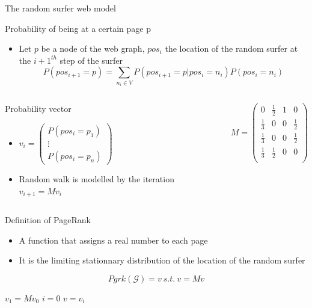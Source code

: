 \documentclass[10pt]{beamer}
\begin{document}
\begin{frame}{The random surfer web model}
\begin{block}{Probability of being at a certain page p}
\begin{itemize}
\item Let $p$ be a node of the web graph, $pos_i$ the location of the random surfer at the $i+1^{th}$ step of the surfer
$$ P(pos_{i+1}=p) = \sum_{n_i\in V} P(pos_{i+1}=p|pos_{i}=n_i)  P(pos_i = n_i)$$
\end{itemize}
\end{block}
\begin{columns}
\centering
\begin{column}{0.5\paperwidth}
\begin{block}{Probability vector}
\begin{itemize}
\item $ v_i =
\begin{pmatrix}
P(pos_i = p_1) \\
\vdots \\
P(pos_i = p_n)
\end{pmatrix}
$
\item Random walk is modelled by the iteration $v_{i+1} = M v_i$
\end{itemize}

\end{block}
\end{column}
\begin{column}{0.4\paperwidth}
$$M = \begin{pmatrix}
0 & \frac{1}{2} & 1 & 0 \\
\frac{1}{3} & 0 & 0 & \frac{1}{2} \\
\frac{1}{3} & 0 & 0 & \frac{1}{2} \\
\frac{1}{3} & \frac{1}{2} & 0 & 0 \\
\end{pmatrix}$$
\end{column}
\end{columns}
\end{frame}

\begin{frame}{Definition of PageRank}
  \begin{definition}
    \begin{itemize}
      \item A function that assigns a real number to each page
	\item It is the limiting stationnary distribution of the location of the random surfer
    \end{itemize}
    $$Pgrk(\mathcal{G}) = v \:s.t.\: v=Mv $$
  \end{definition}
  \begin{algorithm}[H]
    $v_1 = Mv_0$\;
    $i=0$\;
    $v = v_{i}$\;
    \caption{PageRank}
  \end{algorithm}
\end{frame}
\end{document}
